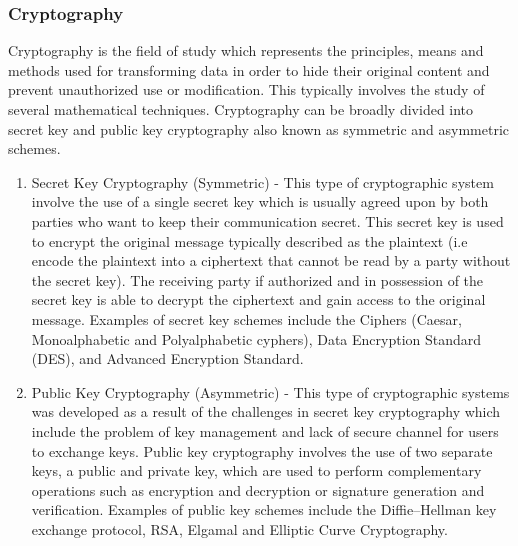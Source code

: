 

\subsubsection*{Cryptography}

Cryptography \cite{Kissel2013} is the field of study which represents the principles, means and methods used for transforming data in order to hide their original content and prevent unauthorized use or modification. This typically involves the study of several mathematical techniques. Cryptography can be broadly divided into secret key and public key cryptography also known as symmetric and asymmetric schemes.

\begin{enumerate}[label=(\arabic*)]
	\item Secret Key Cryptography (Symmetric) - This type of cryptographic system involve the use of a single secret key which is usually agreed upon by both parties who want to keep their communication secret. This secret key is used to encrypt the original message typically described as the plaintext (i.e encode the plaintext into a ciphertext that cannot be read by a party without the secret key). The receiving party if authorized and in possession of the secret key is able to decrypt the ciphertext and gain access to the original message. Examples of secret key schemes include the Ciphers (Caesar, Monoalphabetic and Polyalphabetic cyphers), Data Encryption Standard (DES), and Advanced Encryption Standard. 
	
	\item Public Key Cryptography (Asymmetric) - This type of cryptographic systems was developed as a result of the challenges in secret key cryptography which include the problem of key management and lack of secure channel for users to exchange keys. Public key cryptography involves the use of two separate keys, a public and private key, which are used to perform complementary operations such as encryption and decryption or signature generation and verification. Examples of public key schemes include the Diffie–Hellman key exchange protocol, RSA, Elgamal and Elliptic Curve Cryptography.
\end{enumerate}

